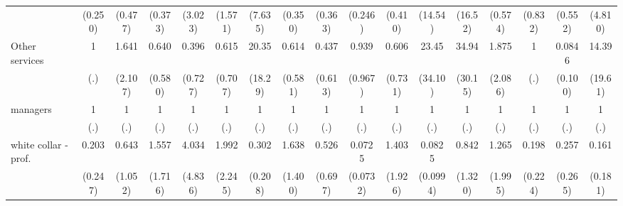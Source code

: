 {\begin{tabular}{l*{16}{c}}
                    &     (0.250)         &     (0.477)         &     (0.373)         &     (3.023)         &     (1.571)         &     (7.635)         &     (0.350)         &     (0.363)         &     (0.246)         &     (0.410)         &     (14.54)         &     (16.52)         &     (0.574)         &     (0.832)         &     (0.552)         &     (4.810)         \\
[1em]
Other services      &           1         &       1.641         &       0.640         &       0.396         &       0.615         &       20.35\sym{***}&       0.614         &       0.437         &       0.939         &       0.606         &       23.45\sym{*}  &       34.94\sym{***}&       1.875         &           1         &      0.0846\sym{*}  &       14.39         \\
                    &         (.)         &     (2.107)         &     (0.580)         &     (0.727)         &     (0.707)         &     (18.29)         &     (0.581)         &     (0.613)         &     (0.967)         &     (0.731)         &     (34.10)         &     (30.15)         &     (2.086)         &         (.)         &     (0.100)         &     (19.61)         \\
[1em]
managers            &           1         &           1         &           1         &           1         &           1         &           1         &           1         &           1         &           1         &           1         &           1         &           1         &           1         &           1         &           1         &           1         \\
                    &         (.)         &         (.)         &         (.)         &         (.)         &         (.)         &         (.)         &         (.)         &         (.)         &         (.)         &         (.)         &         (.)         &         (.)         &         (.)         &         (.)         &         (.)         &         (.)         \\
[1em]
white collar - prof.&       0.203         &       0.643         &       1.557         &       4.034         &       1.992         &       0.302         &       1.638         &       0.526         &      0.0725\sym{**} &       1.403         &      0.0825\sym{*}  &       0.842         &       1.265         &       0.198         &       0.257         &       0.161         \\
                    &     (0.247)         &     (1.052)         &     (1.716)         &     (4.836)         &     (2.245)         &     (0.208)         &     (1.400)         &     (0.697)         &    (0.0732)         &     (1.926)         &    (0.0994)         &     (1.320)         &     (1.995)         &     (0.224)         &     (0.265)         &     (0.181)         \\

\end{tabular}}
